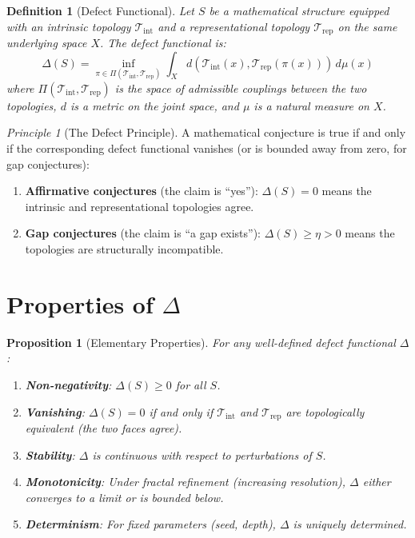 \documentclass[12pt, openany]{book}
\newtheorem{proposition}[theorem]{Proposition}
\newtheorem{definition}[theorem]{Definition}
\theoremstyle{remark}
\newtheorem{principle}[theorem]{Principle}
\newcommand{\Tint}{\mathcal{T}_{\mathrm{int}}}
\newcommand{\Trep}{\mathcal{T}_{\mathrm{rep}}}
\begin{document}
\begin{definition}[Defect Functional]
\label{def:defect}
Let $S$ be a mathematical structure equipped with an intrinsic topology $\Tint$ and a
representational topology $\Trep$ on the same underlying space $X$. The
\emph{defect functional} is:
\[
  \boxed{\Delta(S) = \inf_{\pi \in \Pi(\Tint, \Trep)} \int_X d(\Tint(x), \Trep(\pi(x)))\, d\mu(x)}
\]
where $\Pi(\Tint, \Trep)$ is the space of admissible couplings between the two topologies,
$d$ is a metric on the joint space, and $\mu$ is a natural measure on $X$.
\end{definition}

\begin{principle}[The Defect Principle]
\label{prin:defect}
A mathematical conjecture is true if and only if the corresponding defect functional
vanishes (or is bounded away from zero, for gap conjectures):
\begin{enumerate}
  \item \textbf{Affirmative conjectures} (the claim is ``yes''): $\Delta(S) = 0$ means
        the intrinsic and representational topologies agree.
  \item \textbf{Gap conjectures} (the claim is ``a gap exists''): $\Delta(S) \geq \eta > 0$
        means the topologies are structurally incompatible.
\end{enumerate}
\end{principle}

\section{Properties of $\Delta$}

\begin{proposition}[Elementary Properties]
\label{prop:delta-props}
For any well-defined defect functional $\Delta$:
\begin{enumerate}
  \item \textbf{Non-negativity}: $\Delta(S) \geq 0$ for all $S$.
  \item \textbf{Vanishing}: $\Delta(S) = 0$ if and only if $\Tint$ and $\Trep$ are
        topologically equivalent (the two faces agree).
  \item \textbf{Stability}: $\Delta$ is continuous with respect to perturbations of $S$.
  \item \textbf{Monotonicity}: Under fractal refinement (increasing resolution),
        $\Delta$ either converges to a limit or is bounded below.
  \item \textbf{Determinism}: For fixed parameters (seed, depth), $\Delta$ is
        uniquely determined.
\end{enumerate}
\end{proposition}
\end{document}
